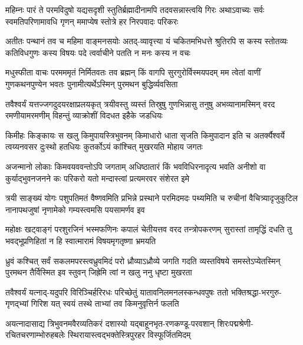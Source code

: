 
\fourlineindentedshloka
{महिम्नः पारं ते परमविदुषो यद्यसदृशी}
{स्तुतिर्ब्रह्मादीनामपि तदवसन्नास्त्वयि गिरः}
{अथाऽवाच्यः सर्वः स्वमतिपरिणामावधि गृणन्}
{ममाप्येष स्तोत्रे हर निरपवादः परिकरः}

\fourlineindentedshloka
{अतीतः पन्थानं तव च महिमा वाङ्मनसयोः}
{अतद्-व्यावृत्त्या यं चकितमभिधत्ते श्रुतिरपि}
{स कस्य स्तोतव्यः कतिविधगुणः कस्य विषयः}
{पदे त्वर्वाचीने पतति न मनः कस्य न वचः}

\fourlineindentedshloka
{मधुस्फीता वाचः परमममृतं निर्मितवतः}
{तव ब्रह्मन् किं वागपि सुरगुरोर्विस्मयपदम्}
{मम त्वेतां वाणीं गुणकथनपुण्येन भवतः}
{पुनामीत्यर्थेऽस्मिन् पुरमथन बुद्धिर्व्यवसिता}

\fourlineindentedshloka
{तवैश्वर्यं यत्तज्जगदुदयरक्षाप्रलयकृत्}
{त्रयीवस्तु व्यस्तं तिस्रुषु गुणभिन्नासु तनुषु}
{अभव्यानामस्मिन् वरद रमणीयामरमणीम्}
{विहन्तुं व्याक्रोशीं विदधत इहैके जडधियः}

\fourlineindentedshloka
{किमीहः किङ्कायः स खलु किमुपायस्त्रिभुवनम्}
{किमाधारो धाता सृजति किमुपादान इति च}
{अतर्क्यैश्वर्ये त्वय्यनवसर दुःस्थो हतधियः}
{कुतर्कोऽयं कांश्चित् मुखरयति मोहाय जगतः}

\fourlineindentedshloka
{अजन्मानो लोकाः किमवयववन्तोऽपि जगताम्}
{अधिष्ठातारं किं भवविधिरनादृत्य भवति}
{अनीशो वा कुर्याद्भुवनजनने कः परिकरो}
{यतो मन्दास्त्वां प्रत्यमरवर संशेरत इमे}

\fourlineindentedshloka
{त्रयी साङ्ख्यं योगः पशुपतिमतं वैष्णवमिति}
{प्रभिन्ने प्रस्थाने परमिदमदः पथ्यमिति च}
{रुचीनां वैचित्र्यादृजुकुटिल नानापथजुषां}
{नृणामेको गम्यस्त्वमसि पयसामर्णव इव}

\fourlineindentedshloka
{महोक्षः खट्वाङ्गं परशुरजिनं भस्मफणिनः}
{कपालं चेतीयत्तव वरद तन्त्रोपकरणम्}
{सुरास्तां तामृद्धिं दधति तु भवद्भूप्रणिहितां}
{न हि स्वात्मारामं विषयमृगतृष्णा भ्रमयति}

\fourlineindentedshloka
{ध्रुवं कश्चित् सर्वं सकलमपरस्त्वध्रुवमिदं}
{परो ध्रौव्याऽध्रौव्ये जगति गदति व्यस्तविषये}
{समस्तेऽप्येतस्मिन् पुरमथन तैर्विस्मित इव}
{स्तुवन् जिह्रेमि त्वां न खलु ननु धृष्टा मुखरता}

\fourlineindentedshloka
{तवैश्वर्यं यत्नाद्-यदुपरि विरिञ्चिर्हरिरधः}
{परिच्छेतुं यातावनिलमनलस्कन्धवपुषः}
{ततो भक्तिश्रद्धा-भरगुरु-गृणद्भ्यां गिरिश यत्}
{स्वयं तस्थे ताभ्यां तव किमनुवृत्तिर्न फलति}

\fourlineindentedshloka
{अयत्नादासाद्य त्रिभुवनमवैरव्यतिकरं}
{दशास्यो यद्बाहूनभृत-रणकण्डू-परवशान्}
{शिरःपद्मश्रेणी-रचितचरणाम्भोरुहबलेः}
{स्थिरायास्त्वद्भक्तेस्त्रिपुरहर विस्फूर्जितमिदम्}

